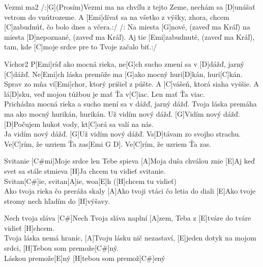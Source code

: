 \documentclass[12pt]{article}
\begin{document}
\begin{song}{Vezmi ma}{2}
	/:[G](Prosím)Vezmi ma na chvíľu z tejto Zeme,
	nechám sa [D]unášať vetrom do vnútrozeme.
	A [Emi]dívať sa na všetko z výšky, zhora,
	chcem [C]zabudnúť, čo bolo dnes a včera.:/
	\columnbreak
	/: Na miesta [G]nové, (zaveď ma Kráľ)
	na miesta [D]nepoznané, (zaveď ma Kráľ).
	Aj tie [Emi]zabudnuté, (zaveď ma Kráľ),
	tam, kde [C]moje srdce pre to Tvoje začalo biť.:/
\end{song}

\begin{song}{Víchor}{2}
	P[Emi]ríď ako mocná rieka,
	ne[G]ch sucho zmení sa v [D]dážď, jarný [C]dážď.
	Ne[Emi]ch láska premôže ma
	[G]ako mocný huri[D]kán, huri[C]kán.
	\\
	Sprav zo mňa ví[Emi]chor,
	ktorý prišiel z púšte.
	A [C]vášeň, ktorá siaha vyššie.
	A lá[D]sku, veď mojou túžbou je mať Ťa v[C]iac.
	Len mať Ťa viac.
	\\
	Prichádza mocná rieka
	a sucho mení sa v dážď, jarný dážď.
	Tvoja láska premáha ma
	ako mocný hurikán, hurikán.
	\columnbreak
	[Emi]Už vidím nový dážď.
	[G]Vidím nový dážď.
	[D]Počujem hukot vody,
	kt[C]orá sa valí na nás.
	\\
	[Emi]Ja vidím nový dážď.
	[G]Už vidím nový dážď.
	Vs[D]távam zo svojho strachu.
	Ve[C]rím, že uzriem Ťa zas[Emi G D]. 
	Ve[C]rím, že uzriem Ťa zas.
\end{song}

\begin{songgroup}{2}
	\begin{groupitem}{Svitanie}
		[C#mi]Moje srdce len Tebe spieva
		[A]Moja duša chválou znie
		[E]Aj keď svet sa stále stmieva
		[H]Ja chcem tu vidieť svitanie.
		\\
		Svitan[C#]ie, svitan[A]ie, woa[E]h
		([H]chcem tu vidieť)
		\\
		[C#mi]Ako tvoja rieka čo preráža skaly
		[A]Ako tvoji vtáci čo letia do diali
		[E]Ako tvoje stromy nech hľadím do [H]výšavy.
	\end{groupitem}
\columnbreak
\begin{groupitem}{Nech tvoja sláva}
	[C#]Nech Tvoja sláva naplní [A]zem,
	Teba z [E]tváre do tváre vidieť [H]chcem.
	\\
	[C#]Tvoja láska nemá hraníc, 
	[A]Tvoju lásku nič nezastaví,
	[E]jeden dotyk na mojom srdci, 
	[H]Tebou som premože[C#]ný.
	\\
	[A]Láskou premože[E]ný
	[H]tebou som premož[C#]ený
\end{groupitem}
\end{songgroup}
\end{document}

